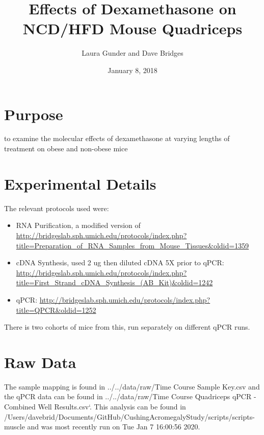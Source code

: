 \documentclass[]{article}
\title{Effects of Dexamethasone on NCD/HFD Mouse Quadriceps}
\author{Laura Gunder and Dave Bridges}
\date{January 8, 2018}
\providecommand{\tightlist}{%
  \setlength{\itemsep}{0pt}\setlength{\parskip}{0pt}}
\begin{document}
\maketitle

{
\setcounter{tocdepth}{2}
\tableofcontents
}
\section{Purpose}\label{purpose}

to examine the molecular effects of dexamethasone at varying lengths of
treatment on obese and non-obese mice

\section{Experimental Details}\label{experimental-details}

The relevant protocols used were:

\begin{itemize}
\tightlist
\item
  RNA Purification, a modified version of
  \url{http://bridgeslab.sph.umich.edu/protocols/index.php?title=Preparation_of_RNA_Samples_from_Mouse_Tissues\&oldid=1359}
\item
  cDNA Synthesis, used 2 ug then diluted cDNA 5X prior to qPCR:
  \url{http://bridgeslab.sph.umich.edu/protocols/index.php?title=First_Strand_cDNA_Synthesis_(AB_Kit)\&oldid=1242}
\item
  qPCR:
  \url{http://bridgeslab.sph.umich.edu/protocols/index.php?title=QPCR\&oldid=1252}
\end{itemize}

There is two cohorts of mice from this, run separately on different qPCR
runs.

\section{Raw Data}\label{raw-data}

The sample mapping is found in ../../data/raw/Time Course Sample Key.csv
and the qPCR data can be found in ../../data/raw/Time Course Quadriceps
qPCR - Combined Well Results.csv`. This analysis can be found in
/Users/davebrid/Documents/GitHub/CushingAcromegalyStudy/scripts/scripts-muscle
and was most recently run on Tue Jan 7 16:00:56 2020.
\end{document}
